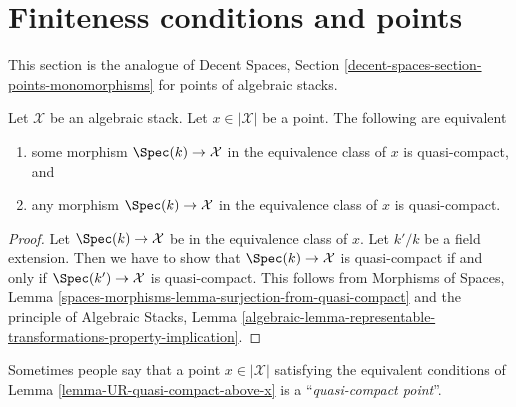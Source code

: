 \section{Finiteness conditions and points}
\label{section-points-conditions}

\noindent
This section is the analogue of
Decent Spaces, Section \ref{decent-spaces-section-points-monomorphisms}
for points of algebraic stacks.

\begin{lemma}
\label{lemma-UR-quasi-compact-above-x}
Let $\mathcal{X}$ be an algebraic stack. Let $x \in |\mathcal{X}|$
be a point. The following are equivalent
\begin{enumerate}
\item some morphism $\Spec(k) \to \mathcal{X}$ in the equivalence
class of $x$ is quasi-compact, and
\item any morphism $\Spec(k) \to \mathcal{X}$ in the equivalence
class of $x$ is quasi-compact.
\end{enumerate}
\end{lemma}

\begin{proof}
Let $\Spec(k) \to \mathcal{X}$ be in the equivalence
class of $x$. Let $k'/k$ be a field extension.
Then we have to show that $\Spec(k) \to \mathcal{X}$ is
quasi-compact if and only if $\Spec(k') \to \mathcal{X}$
is quasi-compact. This follows from
Morphisms of Spaces, Lemma
\ref{spaces-morphisms-lemma-surjection-from-quasi-compact}
and the principle of Algebraic Stacks, Lemma
\ref{algebraic-lemma-representable-transformations-property-implication}.
\end{proof}

\noindent
Sometimes people say that a point $x \in |\mathcal{X}|$ satisfying
the equivalent conditions of Lemma \ref{lemma-UR-quasi-compact-above-x}
is a ``{\it quasi-compact point}''.















